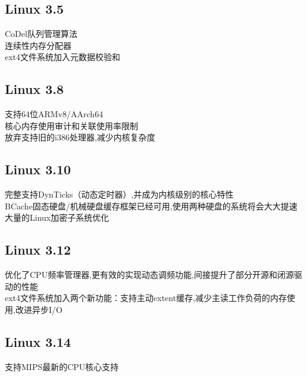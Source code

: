 \documentclass[a4paper,12pt,notitlepage]{article}
\begin{document}
\subsection{Linux 3.5}
	
	CoDel队列管理算法 \\
	
	连续性内存分配器 \\
	
	ext4文件系统加入元数据校验和 \\	
	
\subsection{Linux 3.8}

	支持64位ARMv8/AArch64 \\
	
	核心内存使用审计和关联使用率限制 \\
	
	放弃支持旧的i386处理器,减少内核复杂度 \\
	
\subsection{Linux 3.10}

	完整支持DynTicks（动态定时器）,并成为内核级别的核心特性 \\
	
	BCache固态硬盘/机械硬盘缓存框架已经可用,使用两种硬盘的系统将会大大提速 \\
	
	大量的Linux加密子系统优化 \\
	
\subsection{Linux 3.12}

	优化了CPU频率管理器,更有效的实现动态调频功能,间接提升了部分开源和闭源驱动的性能 \\
	
	ext4文件系统加入两个新功能：支持主动extent缓存,减少主读工作负荷的内存使用,改进异步I/O \\
	
\subsection{Linux 3.14}

	支持MIPS最新的CPU核心支持 \\
	
\end{document}
